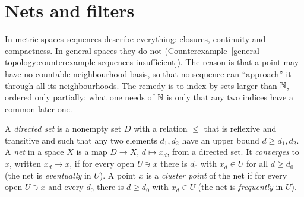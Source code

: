 \section{Nets and filters}\label{general-topology:section-nets}

In metric spaces sequences describe everything: closures, continuity and compactness. In general spaces they do not
(Counterexample~\ref{general-topology:counterexample-sequences-insufficient}). The reason is that a point may have no countable neighbourhood basis, so that no sequence can ``approach'' it
through all its neighbourhoods. The remedy is to index by sets larger than $\mathbb{N}$, ordered only partially: what one needs of $\mathbb{N}$ is only that any two indices have a common later one.

\begin{definition}\label{general-topology:definition-net}
A \emph{directed set} is a nonempty set $D$ with a relation $\leq$ that is reflexive and transitive and such that any two elements $d_1, d_2$ have an upper bound $d \geq d_1, d_2$. A \emph{net} in a
space $X$ is a map $D \to X$, $d \mapsto x_d$, from a directed set. It \emph{converges} to $x$, written $x_d \to x$, if for every open $U \ni x$ there is $d_0$ with $x_d \in U$ for all $d \geq d_0$
(the net is \emph{eventually} in $U$). A point $x$ is a \emph{cluster point} of the net if for every open $U \ni x$ and every $d_0$ there is $d \geq d_0$ with $x_d \in U$ (the net is \emph{frequently} in $U$).
\end{definition}

